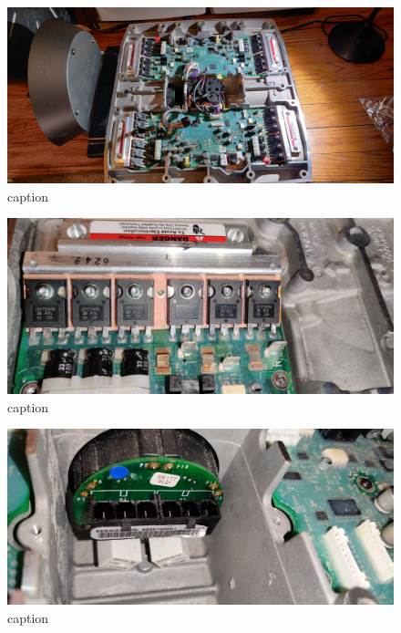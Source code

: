 \documentclass[]{formalLabReport}
\begin{document}
\begin{figure}
    \includegraphics[]{segwayInternalsTop.jpg}
    \caption{caption}
    \label{fig:segwayInternalsTop.jpg}
\end{figure}

\begin{figure}
    \includegraphics[]{segwayMotorDrivers.jpg}
    \caption{caption}
    \label{fig:segwayMotorDrivers.jpg}
\end{figure}

\begin{figure}
    \includegraphics[]{segwayMotorInternal.jpg}
    \caption{caption}
    \label{fig:segwayMotorInternal.jpg}
\end{figure}
\end{document}

